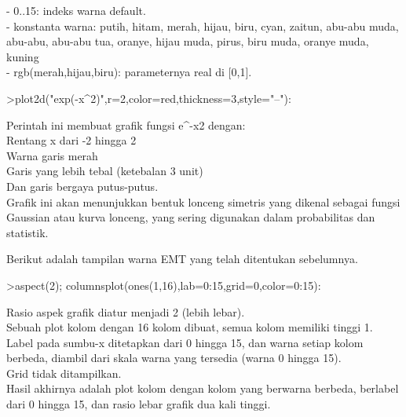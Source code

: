\documentclass{article}
\begin{document}
\begin{eulernotebook}
\begin{eulercomment}
\begin{eulercomment}
\begin{eulercomment}
\begin{eulercomment}
\begin{eulercomment}
\begin{eulercomment}
\begin{eulercomment}
- 0..15: indeks warna default.\\
- konstanta warna: putih, hitam, merah, hijau, biru, cyan, zaitun,
abu-abu muda, abu-abu, abu-abu tua, oranye, hijau muda, pirus, biru
muda, oranye muda, kuning\\
- rgb(merah,hijau,biru): parameternya real di [0,1].
\end{eulercomment}
\begin{eulerprompt}
>plot2d("exp(-x^2)",r=2,color=red,thickness=3,style="--"):
\end{eulerprompt}
\begin{eulercomment}
Perintah ini membuat grafik fungsi e\textasciicircum{}-x2 dengan:\\
Rentang x dari -2 hingga 2\\
Warna garis merah\\
Garis yang lebih tebal (ketebalan 3 unit)\\
Dan garis bergaya putus-putus.\\
Grafik ini akan menunjukkan bentuk lonceng simetris yang dikenal
sebagai fungsi Gaussian atau kurva lonceng, yang sering digunakan
dalam probabilitas dan statistik.

Berikut adalah tampilan warna EMT yang telah ditentukan sebelumnya.
\end{eulercomment}
\begin{eulerprompt}
>aspect(2); columnsplot(ones(1,16),lab=0:15,grid=0,color=0:15):
\end{eulerprompt}
\begin{eulercomment}
Rasio aspek grafik diatur menjadi 2 (lebih lebar).\\
Sebuah plot kolom dengan 16 kolom dibuat, semua kolom memiliki tinggi
1.\\
Label pada sumbu-x ditetapkan dari 0 hingga 15, dan warna setiap kolom
berbeda, diambil dari skala warna yang tersedia (warna 0 hingga 15).\\
Grid tidak ditampilkan.\\
Hasil akhirnya adalah plot kolom dengan kolom yang berwarna berbeda,
berlabel dari 0 hingga 15, dan rasio lebar grafik dua kali tinggi.


\end{eulercomment}
\end{eulercomment}
\end{eulercomment}
\end{eulercomment}
\end{eulercomment}
\end{eulercomment}
\end{eulercomment}
\end{eulernotebook}
\end{document}
